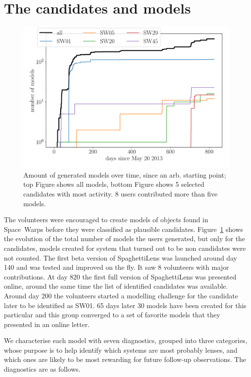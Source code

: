 \section{The candidates and models}

\begin{figure}
  \includegraphics[width=\linewidth]{img/timelapse3}
  \caption{Amount of generated models over time, since an arb. starting point; top Figure shows all models, bottom Figure shows 5 selected candidates with most activity. 8 users contributed more than five models. }
  \label{fig:time}
\end{figure}

The volunteers were encouraged to create models of objects found in Space~Warps before they were classified as plausible candidates.
Figure~\ref{fig:time} shows the evolution of the total number of models the users generated, but only for the candidates, models created for system that turned out to be non candidates were not counted.
The first beta version of SpaghettiLens was launched around day 140 and was tested and improved on the fly.
It saw 8 volunteers with major contributions.
At day 820 the first full version of SpaghettiLens was presented online, around the same time the list of identified candidates was available.
Around day 200 the volunteers started a modelling challenge for the candidate later to be identified as SW01.
65 days later 30 models have been created for this particular and this group converged to a set of favorite models that they presented in an online letter.


We characterise each model with seven diagnostics, grouped into three 
categories, whose purpose is to help identify which systems are most probably 
lenses, and which ones are likely to be most rewarding for future follow-up 
observations. The diagnostics are as follows.

